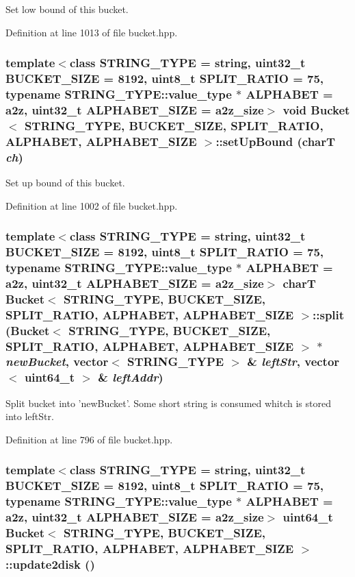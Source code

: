 Set low bound of this bucket. 

Definition at line 1013 of file bucket.hpp.\hypertarget{classBucket_b84ee68f2451e8b74f7bbd0ec40f6815}{
\subsubsection[{setUpBound}]{\setlength{\rightskip}{0pt plus 5cm}template$<$class STRING\_\-TYPE  = string, uint32\_\-t BUCKET\_\-SIZE = 8192, uint8\_\-t SPLIT\_\-RATIO = 75, typename STRING\_\-TYPE::value\_\-type $\ast$ ALPHABET = a2z, uint32\_\-t ALPHABET\_\-SIZE = a2z\_\-size$>$ void {\bf Bucket}$<$ STRING\_\-TYPE, BUCKET\_\-SIZE, SPLIT\_\-RATIO, ALPHABET, ALPHABET\_\-SIZE $>$::setUpBound (charT {\em ch})}}
\label{classBucket_b84ee68f2451e8b74f7bbd0ec40f6815}


Set up bound of this bucket. 

Definition at line 1002 of file bucket.hpp.\hypertarget{classBucket_0400e7c792f912c5d884cc15b0126fea}{
\subsubsection[{split}]{\setlength{\rightskip}{0pt plus 5cm}template$<$class STRING\_\-TYPE  = string, uint32\_\-t BUCKET\_\-SIZE = 8192, uint8\_\-t SPLIT\_\-RATIO = 75, typename STRING\_\-TYPE::value\_\-type $\ast$ ALPHABET = a2z, uint32\_\-t ALPHABET\_\-SIZE = a2z\_\-size$>$ charT {\bf Bucket}$<$ STRING\_\-TYPE, BUCKET\_\-SIZE, SPLIT\_\-RATIO, ALPHABET, ALPHABET\_\-SIZE $>$::split ({\bf Bucket}$<$ STRING\_\-TYPE, BUCKET\_\-SIZE, SPLIT\_\-RATIO, ALPHABET, ALPHABET\_\-SIZE $>$ $\ast$ {\em newBucket}, \/  vector$<$ STRING\_\-TYPE $>$ \& {\em leftStr}, \/  vector$<$ uint64\_\-t $>$ \& {\em leftAddr})}}
\label{classBucket_0400e7c792f912c5d884cc15b0126fea}


Split bucket into 'newBucket'. Some short string is consumed whitch is stored into leftStr. 

Definition at line 796 of file bucket.hpp.\hypertarget{classBucket_64a8ed1acf8ff0e212564a6711a125ff}{
\subsubsection[{update2disk}]{\setlength{\rightskip}{0pt plus 5cm}template$<$class STRING\_\-TYPE  = string, uint32\_\-t BUCKET\_\-SIZE = 8192, uint8\_\-t SPLIT\_\-RATIO = 75, typename STRING\_\-TYPE::value\_\-type $\ast$ ALPHABET = a2z, uint32\_\-t ALPHABET\_\-SIZE = a2z\_\-size$>$ uint64\_\-t {\bf Bucket}$<$ STRING\_\-TYPE, BUCKET\_\-SIZE, SPLIT\_\-RATIO, ALPHABET, ALPHABET\_\-SIZE $>$::update2disk ()}}
\label{classBucket_64a8ed1acf8ff0e212564a6711a125ff}


